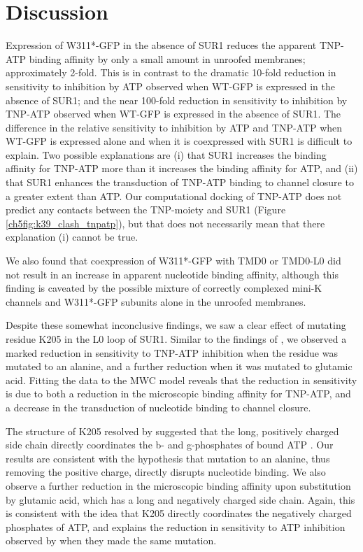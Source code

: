 \section{Discussion}

Expression of W311*-GFP in the absence of SUR1 reduces the apparent TNP-ATP binding affinity by only a small amount in unroofed membranes; approximately 2-fold.
This is in contrast to the dramatic 10-fold reduction in sensitivity to inhibition by ATP observed when WT-GFP is expressed in the absence of SUR1; and the near 100-fold reduction in sensitivity to inhibition by TNP-ATP observed when WT-GFP is expressed in the absence of SUR1.
The difference in the relative sensitivity to inhibition by ATP and TNP-ATP when WT-GFP is expressed alone and when it is coexpressed with SUR1 is difficult to explain.
Two possible explanations are (i) that SUR1 increases the binding affinity for TNP-ATP more than it increases the binding affinity for ATP, and (ii) that SUR1 enhances the transduction of TNP-ATP binding to channel closure to a greater extent than ATP.
Our computational docking of TNP-ATP does not predict any contacts between the TNP-moiety and SUR1 (Figure \ref{ch5fig:k39_clash_tnpatp}), but that does not necessarily mean that there explanation (i) cannot be true.

We also found that coexpression of W311*-GFP with TMD0 or TMD0-L0 did not result in an increase in apparent nucleotide binding affinity, although this finding is caveated by the possible mixture of correctly complexed mini-K\ATP{} channels and W311*-GFP subunits alone in the unroofed membranes.

Despite these somewhat inconclusive findings, we saw a clear effect of mutating residue K205 in the L0 loop of SUR1.
Similar to the findings of \textcite{ding_structural_2019}, we observed a marked reduction in sensitivity to TNP-ATP inhibition when the residue was mutated to an alanine, and a further reduction when it was mutated to glutamic acid.
Fitting the data to the MWC model reveals that the reduction in sensitivity is due to both a reduction in the microscopic binding affinity for TNP-ATP, and a decrease in the transduction of nucleotide binding to channel closure.

The structure of K205 resolved by \textcite{ding_structural_2019} suggested that the long, positively charged side chain directly coordinates the \textgreek{b}- and \textgreek{g}-phosphates of bound ATP \cite{ding_structural_2019}.
Our results are consistent with the hypothesis that mutation to an alanine, thus removing the positive charge, directly disrupts nucleotide binding.
We also observe a further reduction in the microscopic binding affinity upon substitution by glutamic acid, which has a long and negatively charged side chain.
Again, this is consistent with the idea that K205 directly coordinates the negatively charged phosphates of ATP, and explains the reduction in sensitivity to ATP inhibition observed by \textcite{pratt_engineered_2012} when they made the same mutation.

